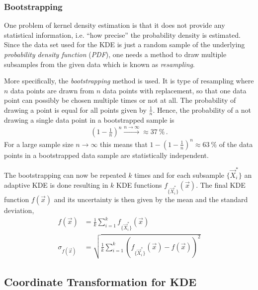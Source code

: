 \subsubsection{Bootstrapping}

One problem of kernel density estimation is that it does not provide any statistical information, i.e. \enquote{how precise} the probability density is estimated. Since the data set used for the KDE is just a random sample of the underlying \textit{probability density function} (\textit{PDF}), one needs a method to draw multiple subsamples from the given data which is known as \textit{resampling}.

More specifically, the \textit{bootstrapping} method is used. It is type of resampling where $n$ data points are drawn from $n$ data points with replacement, so that one data point can possibly be chosen multiple times or not at all. The probability of drawing a point is equal for all points given by $\frac{1}{n}$. Hence, the probability of a not drawing a single data point in a bootstrapped sample is
\begin{align}
	\left(1-\frac{1}{n}\right)^n \overset{n\to\infty}{\longrightarrow} \approx\SI{37}{\percent}\,.
\end{align}
For a large sample size $n\to\infty$ this means that $1-\left(1-\frac{1}{n}\right)^n\approx\SI{63}{\percent}$ of the data points in a bootstrapped data sample are statistically independent.

The bootstrapping can now be repeated $k$ times and for each subsample $\{\vec{X}_i^\ast\}$ an adaptive KDE is done resulting in $k$ KDE functions $f_{\{\vec{X}_i^\ast\}}(\vec{x})$. The final KDE function $f(\vec{x})$ and its uncertainty is then given by the mean and the standard deviation,~\cite{kde:bootstrapping,kde:schoenen}
\begin{subequations}
	\begin{align}
		f(\vec{x}) &= \frac{1}{k}\sum_{i=1}^{k} f_{\{\vec{X}_i^\ast\}}(\vec{x})\\
		\sigma_{f(\vec{x})}	&= \sqrt{\frac{1}{k}\sum_{i=1}^{k}\left(f_{\{\vec{X}_i^\ast\}}(\vec{x}) - f(\vec{x})\right)^2}
	\end{align}
\end{subequations}

\subsection{Coordinate Transformation for KDE}

